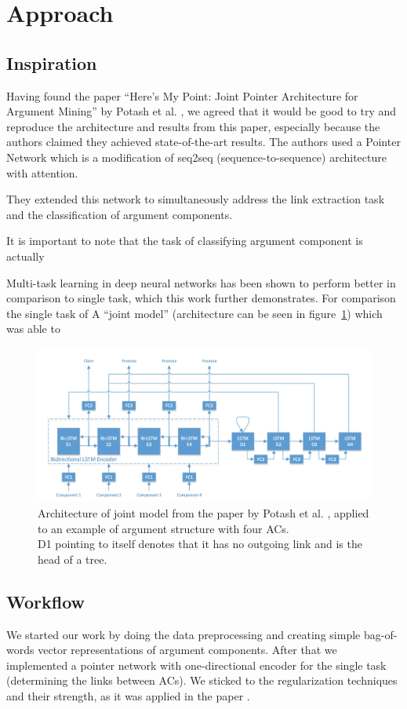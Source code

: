 \documentclass[onecolumn]{article}
\begin{document}
\section{Approach}
\subsection{Inspiration}
Having found the paper ``Here's My Point: Joint Pointer Architecture for Argument Mining'' by Potash et al. \cite{potash2017here}, we agreed that it
would be good to try and reproduce the architecture and results from this paper, especially because the authors claimed they achieved
state-of-the-art results. The authors used a Pointer Network which is a modification of seq2seq (sequence-to-sequence) architecture with attention.

They extended this network to simultaneously address the link extraction task and the classification of argument components.

It is important to note that the task of classifying argument component is actually 

Multi-task learning in deep neural networks has been shown to perform better in comparison to single task, which this work further demonstrates.
For comparison the single task of 
A ``joint model'' (architecture can be seen in figure~\ref{fig:joint}) which was able to

\begin{figure}[h]
    \centering
    \includegraphics[width=0.8\linewidth]{fig/joint.png}
    \caption{Architecture of joint model from the paper by Potash et al. \cite{potash2017here}, applied to an example of argument structure with four ACs.
            \\D1 pointing to itself denotes that it has no outgoing link and is the head of a tree.}
    \label{fig:joint}
        \end{figure}

\subsection{Workflow}
We started our work by doing the data preprocessing and creating simple bag-of-words vector representations of argument components. 
After that we implemented a pointer network with one-directional encoder for the single task (determining the links between ACs).
We sticked to the regularization techniques and their strength, as it was applied in the paper \cite{potash2017here}. 
\end{document}
